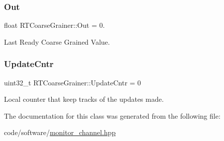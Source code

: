 \mbox{\label{classRTCoarseGrainer_a341ec4b52b5f79b15102fc1641a93b8f}} 
\subsubsection{\texorpdfstring{Out}{Out}}
{\footnotesize\ttfamily float R\+T\+Coarse\+Grainer\+::\+Out = 0.}



Last Ready Coarse Grained Value. 

\mbox{\label{classRTCoarseGrainer_aea262e8f08584c79ac097e8d57dfa909}} 
\subsubsection{\texorpdfstring{Update\+Cntr}{UpdateCntr}}
{\footnotesize\ttfamily uint32\+\_\+t R\+T\+Coarse\+Grainer\+::\+Update\+Cntr = 0}



Local counter that keep tracks of the updates made. 



The documentation for this class was generated from the following file\+:\begin{DoxyCompactItemize}
\item 
code/software/\hyperlink{monitor__channel_8hpp}{monitor\+\_\+channel.\+hpp}\end{DoxyCompactItemize}
